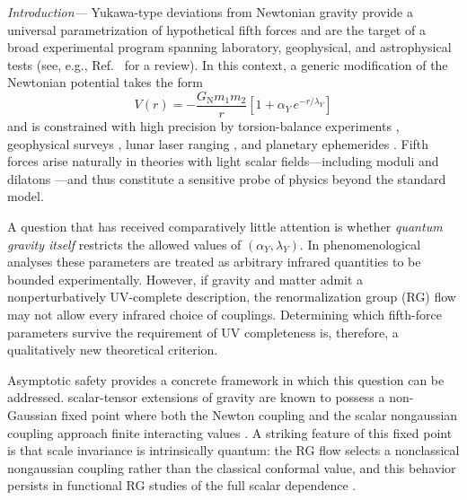 \documentclass[reprint,superscriptaddress,amsmath,amssymb,aps,prl,floatfix]{revtex4-2}
\def\paragraph#1{
   \textit{#1}
  \unskip
}
\newcommand{\alphay}{\alpha_Y}
\newcommand{\lamy}{\lambda_Y}
\newcommand{\GN}{G_{\mathrm{N}}}
\begin{document}
\paragraph{Introduction—}Yukawa-type deviations from Newtonian gravity provide a universal parametrization of hypothetical fifth forces \cite{Fischbach:1996eq,Fischbachbook,PhysRevLett.56.3} and are the target of a broad experimental program spanning laboratory, geophysical, and astrophysical tests (see, e.g., Ref.~\cite{Will:2014kxa} for a review). In this context, a generic modification of the Newtonian potential takes the form
\begin{equation}
	V(r) = -\frac{\GN m_1 m_2}{r}\left[1 + \alphay\,e^{-r/\lamy}\right]
	\label{eq:Yukawa-potential}
\end{equation}
and is constrained with high precision by torsion-balance experiments \cite{Kapner:2006si,Adelberger:2009zz}, geophysical surveys \cite{Anderson1989}, lunar laser ranging \cite{Williams:2004qba}, and planetary ephemerides \cite{Fienga2011}. Fifth forces arise naturally in theories with light scalar fields---including moduli and dilatons \cite{Damour:1994zq,FujiiMaedaBook}---and thus constitute a sensitive probe of physics beyond the standard model.

A question that has received comparatively little attention is whether \emph{quantum gravity itself} restricts the allowed values of $(\alphay,\lamy)$. In phenomenological analyses these parameters are treated as arbitrary infrared quantities to be bounded experimentally. However, if gravity and matter admit a nonperturbatively UV-complete description, the renormalization group (RG) flow may not allow every infrared choice of couplings. Determining which fifth-force parameters survive the requirement of UV completeness is,  therefore, a qualitatively new theoretical criterion.

Asymptotic safety provides a concrete framework in which this question can be addressed. scalar-tensor extensions of gravity \cite{Quiros:2019ktw,Zhang:2023nil,Huang:2024gvi} are known to possess a non-Gaussian fixed point where both the Newton coupling and the scalar nongaussian coupling approach finite interacting values \cite{Percacci:2009fh,Narain:2009fy,Hamada:2017rrp}. A striking feature of this fixed point is that scale invariance is intrinsically quantum: the RG flow selects a nonclassical nongaussian coupling rather than the classical conformal value, and this behavior persists in functional RG studies of the full scalar dependence \cite{Percacci:2015wwa,bonanno2025propertimefunctionalrenormalizationon}.
\end{document}
